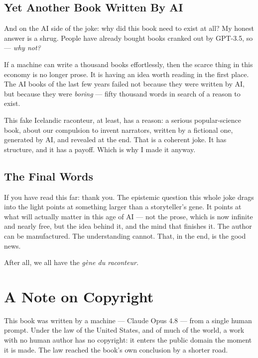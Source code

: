 \section*{Yet Another Book Written By AI}

And on the AI side of the joke: why did this book need to exist at all? My honest answer is a shrug. People have already bought books cranked out by GPT-3.5, so — \emph{why not?}

If a machine can write a thousand books effortlessly, then the scarce thing in this economy is no longer prose. It is having an idea worth reading in the first place. The AI books of the last few years failed not because they were written by AI, but because they were \emph{boring} — fifty thousand words in search of a reason to exist.

This fake Icelandic raconteur, at least, has a reason: a serious popular-science book, about our compulsion to invent narrators, written by a fictional one, generated by AI, and revealed at the end. That is a coherent joke. It has structure, and it has a payoff. Which is why I made it anyway.

\section*{The Final Words}

If you have read this far: thank you. The epistemic question this whole joke drags into the light points at something larger than a storyteller's gene. It points at what will actually matter in this age of AI — not the prose, which is now infinite and nearly free, but the idea behind it, and the mind that finishes it. The author can be manufactured. The understanding cannot. That, in the end, is the good news.

After all, we all have the \emph{gène du raconteur.}

\chapter*{A Note on Copyright}
{} %

This book was written by a machine — Claude Opus 4.8 — from a single human prompt. Under the law of the United States, and of much of the world, a work with no human author has no copyright: it enters the public domain the moment it is made. The law reached the book's own conclusion by a shorter road.

